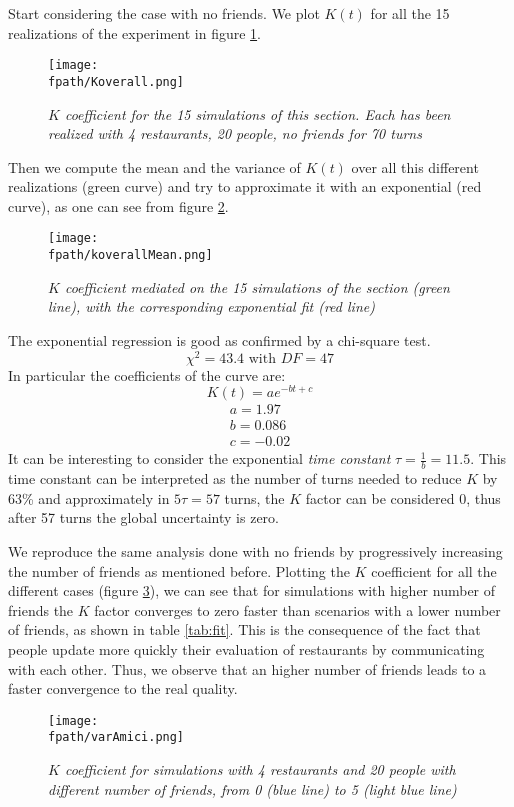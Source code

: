 \documentclass[10pt,a4paper,usenatbib]{article}
\newcommand{\fpath}{./Figs/}
\begin{document}
Start considering the case with no friends. We plot $K(t)$ for all the 15 realizations of the experiment in  figure \ref{fig:15re}.
\begin{figure}[h]
  \centering
  \texttt{[image: \\fpath/Koverall.png]}
  \caption{\small \textit{$K$ coefficient for the 15 simulations of this section. Each has been realized with 4 restaurants, 20 people, no friends for 70 turns}}
  \label{fig:15re}
\end{figure}
Then we compute the mean and the variance of $K(t)$ over all this different realizations (green curve) and try to approximate it with an exponential (red curve), as one can see from figure \ref{fig:aprox}.
\begin{figure}[h]
  \centering
  \texttt{[image: \\fpath/koverallMean.png]}
  \caption{\small \textit{$K$ coefficient mediated on the 15 simulations of the section (green line), with the corresponding exponential fit (red line)}}
  \label{fig:aprox}
\end{figure} 
The exponential regression is good as confirmed by a chi-square test.\\
$${\chi ^2} = 43.4 \text{ with } DF = 47$$
In particular the coefficients of the curve are:
\[K\left( t \right) = a{e^{ - bt + c}}\] 
\[\begin{array}{l}
a = 1.97\\
b = 0.086\\
c =  - 0.02
\end{array}\]
It can be interesting to consider the exponential \textit{time constant} $\tau  = \frac{1}{b} = 11.5$. This time constant can be interpreted as the number of turns needed to reduce $K$ by 63\% and approximately in $5 \tau = 57$ turns, the $K$ factor can be considered $0$, thus after 57 turns the global uncertainty is zero.

We reproduce the same analysis done with no friends by progressively increasing the number of friends as mentioned before.
Plotting the $K$ coefficient for all the different cases (figure \ref{fig:4curves}), we can see that for simulations with higher number of friends the $K$ factor converges to zero faster than scenarios with a lower number of friends, as shown in table \ref{tab:fit}. This is the consequence of the fact that people update more quickly their evaluation of restaurants by communicating with each other.  Thus, we observe that an higher number of friends leads to a faster convergence to the real quality.

\begin{figure}[!htb]
  \centering
  \texttt{[image: \\fpath/varAmici.png]}
  \caption{\small \textit{$K$ coefficient for simulations with 4 restaurants and 20 people with different number of friends, from 0 (blue line) to 5 (light blue line)}}
  \label{fig:4curves}
\end{figure}
\end{document}
